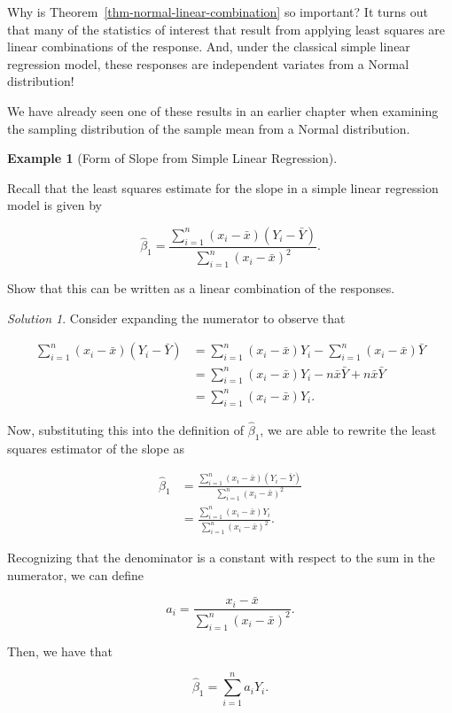\documentclass[
  letterpaper,
  DIV=11,
  numbers=noendperiod]{scrreprt}
\theoremstyle{definition}
\theoremstyle{plain}
\theoremstyle{definition}
\newtheorem{example}{Example}[chapter]
\theoremstyle{remark}
\newtheorem*{solution}{Solution}
\begin{document}
Why is Theorem~\ref{thm-normal-linear-combination} so important? It
turns out that many of the statistics of interest that result from
applying least squares are linear combinations of the response. And,
under the classical simple linear regression model, these responses are
independent variates from a Normal distribution!

We have already seen one of these results in an earlier chapter when
examining the sampling distribution of the sample mean from a Normal
distribution.

\begin{example}[Form of Slope from Simple Linear
Regression]\protect\hypertarget{exm-slope-linear-combination}{}\label{exm-slope-linear-combination}

Recall that the least squares estimate for the slope in a simple linear
regression model is given by

\[\widehat{\beta}_1 = \frac{\sum_{i=1}^{n} \left(x_i - \bar{x}\right)\left(Y_i - \bar{Y}\right)}{\sum_{i=1}^{n} \left(x_i - \bar{x}\right)^2}.\]

Show that this can be written as a linear combination of the responses.

\end{example}

\begin{solution}
Consider expanding the numerator to observe that

\[
\begin{aligned}
  \sum_{i=1}^{n} \left(x_i - \bar{x}\right) \left(Y_i - \bar{Y}\right)
    &= \sum_{i=1}^{n} \left(x_i - \bar{x}\right) Y_i - \sum_{i=1}^{n} \left(x_i - \bar{x}\right) \bar{Y} \\
    &= \sum_{i=1}^{n} \left(x_i - \bar{x}\right) Y_i - n\bar{x}\bar{Y} + n\bar{x}\bar{Y} \\
    &= \sum_{i=1}^{n} \left(x_i - \bar{x}\right) Y_i.
\end{aligned}
\]

Now, substituting this into the definition of \(\widehat{\beta}_1\), we
are able to rewrite the least squares estimator of the slope as

\[
\begin{aligned}
  \widehat{\beta}_1
    &= \frac{\sum_{i=1}^{n} \left(x_i - \bar{x}\right)\left(Y_i - \bar{Y}\right)}{\sum_{i=1}^{n} \left(x_i - \bar{x}\right)^2} \\
    &= \frac{\sum_{i=1}^{n} \left(x_i - \bar{x}\right) Y_i}{\sum_{i=1}^{n} \left(x_i - \bar{x}\right)^2}. 
\end{aligned}
\]

Recognizing that the denominator is a constant with respect to the sum
in the numerator, we can define

\[a_i = \frac{x_i - \bar{x}}{\sum_{i=1}^{n} \left(x_i - \bar{x}\right)^2}.\]

Then, we have that

\[\widehat{\beta}_1 = \sum_{i=1}^{n} a_i Y_i.\]
\end{solution}
\end{document}

